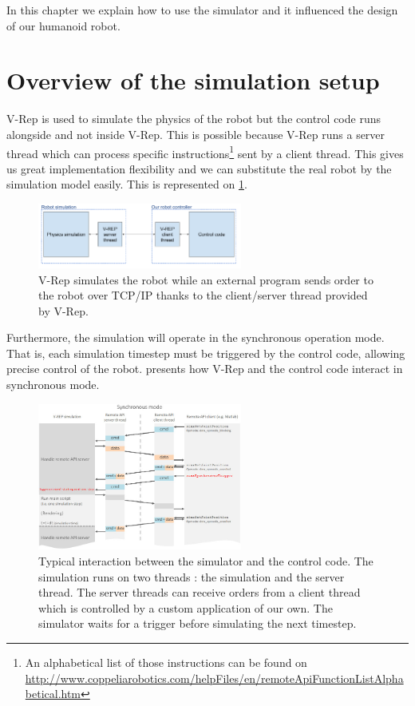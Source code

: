 In this chapter we explain how to use the simulator and it influenced the design of our humanoid robot.

\section{Overview of the simulation setup}
V-Rep is used to simulate the physics of the robot but the control code runs alongside and not inside V-Rep. This is possible because V-Rep runs a server thread which can process specific instructions\footnote{An alphabetical list of those instructions can be found on \url{http://www.coppeliarobotics.com/helpFiles/en/remoteApiFunctionListAlphabetical.htm}} sent by a client thread. This gives us great implementation flexibility and we can substitute the real robot by the simulation model easily. This is represented on \cref{fig:simulation_principles}.

\begin{figure}[htp]
\center
\includegraphics[width=0.6\textwidth]{figures/simulation_principles}
\caption[Simulation principles]{V-Rep simulates the robot while an external program sends order to the robot over TCP/IP thanks to the client/server thread provided by V-Rep.}
\label{fig:simulation_principles}
\end{figure}

Furthermore, the simulation will operate in the synchronous operation mode. That is, each simulation timestep must be triggered by the control code, allowing precise control of the robot.  presents how V-Rep and the control code interact in synchronous mode.

\begin{figure}[htp]
\center
\includegraphics[width=0.6\textwidth]{figures/remoteApiSynchronous}
\caption[Simulation interaction]{Typical interaction between the simulator and the control code. The simulation runs on two threads : the simulation and the server thread. The server threads can receive orders from a client thread which is controlled by a custom application of our own. The simulator waits for a trigger before simulating the next timestep.}
\label{fig:remoteApi}
\end{figure}

